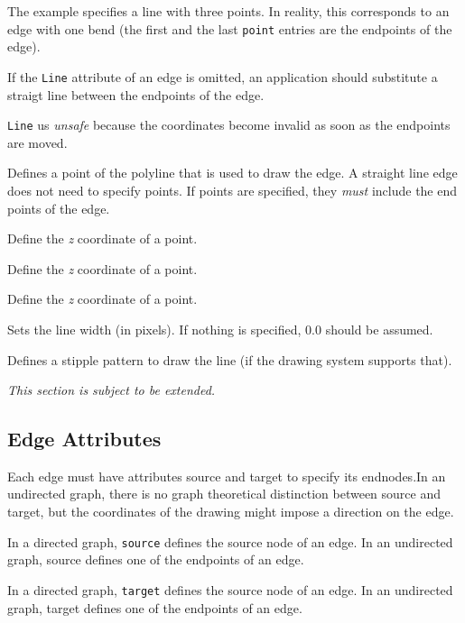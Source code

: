 \begin{GMLAttributes}
  \noindent The example specifies a line with three points. In reality,
  this corresponds to an edge with one bend (the first and the
  last \texttt{point} entries are the endpoints of the edge).

  \begin{notes}
    \item If the \texttt{Line} attribute of an edge is omitted,
    an application should substitute a straigt line between the
    endpoints of the edge.
    \item \texttt{Line} us \emph{unsafe} because the coordinates
    become invalid as soon as the endpoints are moved.
  \end{notes}
  
   Defines a point of the
  polyline that is used to draw the edge.  A straight line edge
  does not need to specify points. If points are specified, they
  \emph{must} include the end points of the edge.
  
   Define the \emph{z}
  coordinate of a point.
  
   Define the \emph{z}
  coordinate of a point.
  
   Define the \emph{z}
  coordinate of a point.
  
   Sets the line width (in
  pixels). If nothing is specified, 0.0 should be assumed.
  
   Defines a stipple pattern
  to draw the line (if the drawing system supports that).

\end{GMLAttributes}

\noindent \emph{This section is subject to be extended.}


\subsection{Edge Attributes}
\label{s:GML:EdgeAttributes}

Each edge must have attributes source and target to specify its
endnodes.In an undirected graph, there is no graph theoretical
distinction between source and target, but the coordinates of the
drawing might impose a direction on the edge.

\begin{GMLAttributes}

  In a directed graph, \texttt{source} defines the source node of
  an edge.  In an undirected graph, source defines one of the
  endpoints of an edge.

  In a directed graph, \texttt{target} defines the source node of
  an edge.  In an undirected graph, target defines one of the
  endpoints of an edge.

\end{GMLAttributes}



